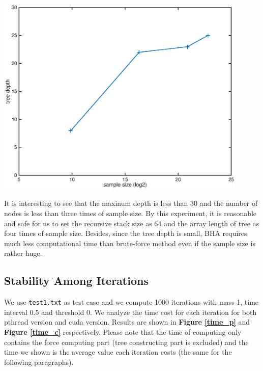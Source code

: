 \documentclass[11pt, a4paper]{article}
\makeatletter
\newcommand\fcaption{\def\@captype{figure}\caption}
\newcommand{\fref}[1]{\textbf{Figure \ref{#1}}}
\makeatother
\begin{document}
\begin{center}
    \includegraphics[width=12cm]{depth}
    \fcaption{Tree depth for test cases}
\end{center}

It is interesting to see that the maxinum depth is less than 30 and the number of nodes is less than three times of sample size. By this experiment, it is reasonable and safe for us to set the recursive stack size as 64 and the array length of tree as four times of sample size. Besides, since the tree depth is small, BHA requires much less computational time than brute-force method even if the sample size is rather huge.

\subsection{Stability Among Iterations}

We use \texttt{test1.txt} as test case and we compute 1000 iterations with mass 1, time interval 0.5 and threshold 0. We analyze the time cost for each iteration for both pthread version and cuda version. Results are shown in \fref{time_p} and \fref{time_c} respectively. Please note that the time of computing only contains the force computing part (tree constructing part is excluded) and the time we shown is the average value each iteration costs (the same for the following paragraphs).
\end{document}
